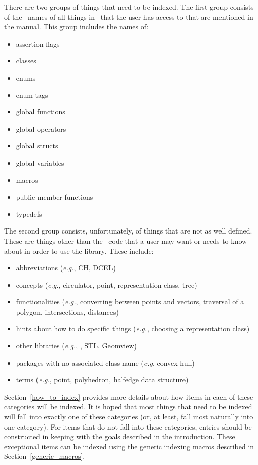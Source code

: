 \documentclass[11pt]{article}
\begin{document}
There are two groups of things that need to be indexed.  The first group
consists of the \CC\ names of all things in \cgal\  that the user has access 
to that are mentioned in the manual.  This group includes the names of:
   \begin{itemize}
      \item assertion flags 
      \item classes
      \item enums
      \item enum tags
      \item global functions
      \item global operators
      \item global structs
      \item global variables 
      \item macros
      \item public member functions
      \item typedefs
   \end{itemize}

The second group consists, unfortunately, of things that are not as well 
defined.  These are things other than the \CC\ code
that a user may want or needs to know about in order 
to use the library.  These include:
   \begin{itemize}
      \item abbreviations ({\em e.g.}, CH, DCEL)
      \item concepts ({\em e.g.}, circulator, point, representation class, tree)
      \item functionalities ({\em e.g.}, converting between points and vectors,
                             traversal of a polygon, intersections, distances)
      \item hints about how to do specific things ({\em e.g.}, choosing a 
            representation class)
      \item other libraries ({\em e.g.}, \leda, STL, Geomview)
      \item packages with no associated class name ({\em e.g}, convex hull)
      \item terms ({\em e.g.}, point, polyhedron, halfedge data structure)
   \end{itemize}

Section~\ref{how_to_index} provides more details about how items in each of 
these categories will be indexed.
It is hoped that most things that need to be indexed will fall into exactly 
one of these categories (or, at least, fall most naturally into one category). 
For items that do not fall into these categories, entries should be 
constructed in keeping with the goals described in the introduction.
These exceptional items can be indexed using the generic
indexing macros described in Section~\ref{generic_macros}.  
\end{document}
